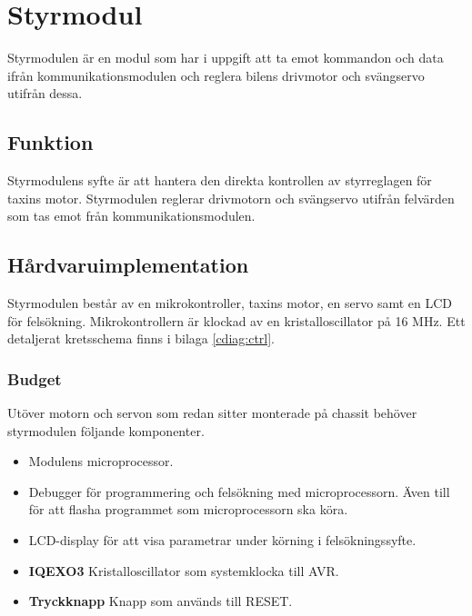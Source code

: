 \documentclass[tekniskrapport/tech.tex]{subfiles}
\begin{document}
\section{Styrmodul}
Styrmodulen är en modul som har i uppgift att ta emot kommandon och data ifrån
kommunikationsmodulen och reglera bilens drivmotor och svängservo utifrån
dessa.

\subsection{Funktion}
Styrmodulens syfte är att hantera den direkta kontrollen av styrreglagen för
taxins motor. Styrmodulen reglerar drivmotorn och svängservo utifrån
felvärden som tas emot från kommunikationsmodulen.

\subsection{Hårdvaruimplementation}
Styrmodulen består av en mikrokontroller, taxins motor, en servo samt en LCD för
felsökning. Mikrokontrollern är klockad av en kristalloscillator på 16 MHz. Ett
detaljerat kretsschema finns i bilaga \ref{cdiag:ctrl}.

\subsubsection{Budget}
Utöver motorn och servon som redan sitter monterade på chassit behöver
styrmodulen följande komponenter.
\begin{itemize}
	\item \textbf{\modMicrocontroller} Modulens microprocessor. 
    \item \textbf{\modJtag} Debugger för programmering och felsökning med
        microprocessorn. Även till för att flasha programmet som
        microprocessorn ska köra.
    \item \textbf{\modLcd} LCD-display för att visa parametrar under körning i
        felsökningssyfte.
    \item \textbf{IQEXO3} Kristalloscillator som systemklocka till AVR.
    \item \textbf{Tryckknapp} Knapp som används till RESET.
\end{itemize}
\end{document}
